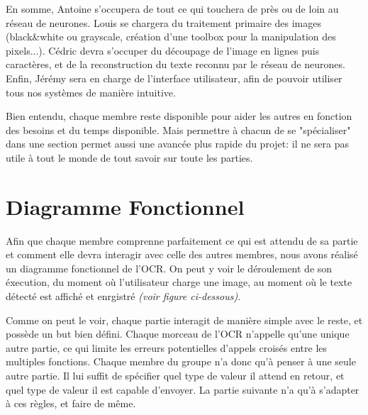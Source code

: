 \documentclass[12pt]{report}
\begin{document}
En somme, Antoine s'occupera de tout ce qui touchera de près ou de loin au réseau de neurones. Louis se chargera du traitement primaire des images (black\&white ou grayscale, création d'une toolbox pour la manipulation des pixels...). Cédric devra s'occuper du découpage de l'image en lignes puis caractères, et de la reconstruction du texte reconnu par le réseau de neurones. Enfin, Jérémy sera en charge de l'interface utilisateur, afin de pouvoir utiliser tous nos systèmes de manière intuitive.

Bien entendu, chaque membre reste disponible pour aider les autres en fonction des besoins et du temps disponible. Mais permettre à chacun de se "spécialiser" dans une section permet aussi une avancée plus rapide du projet: il ne sera pas utile à tout le monde de tout savoir sur toute les parties.

\chapter{Diagramme Fonctionnel}

Afin que chaque membre comprenne parfaitement ce qui est attendu de sa partie et comment elle devra interagir avec celle des autres membres, nous avons réalisé un diagramme fonctionnel de l'OCR. On peut y voir le déroulement de son éxecution, du moment où l'utilisateur charge une image, au moment où le texte détecté est affiché et enrgistré \textit{(voir figure ci-dessous)}.

Comme on peut le voir, chaque partie interagit de manière simple avec le reste, et possède un but bien défini. Chaque morceau de l'OCR n'appelle qu'une unique autre partie, ce qui limite les erreurs potentielles d'appels croisés entre les multiples fonctions. Chaque membre du groupe n'a donc qu'à penser à une seule autre partie. Il lui suffit de spécifier quel type de valeur il attend en retour, et quel type de valeur il est capable d'envoyer. La partie suivante n'a qu'à s'adapter à ces règles, et faire de même.
\end{document}
